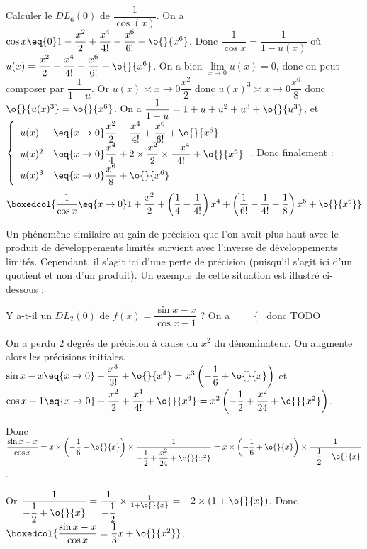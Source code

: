 \documentclass[a4paper,french,bookmarks]{article}
\begin{document}
\begin{example}{}{}
    Calculer le $DL_6(0)$ de $\dfrac{1}{\cos(x)}$.
    \tcblower
    On a $\cos x \eq{0} 1 - \dfrac{x^2}{2} + \dfrac{x^4}{4!} - \dfrac{x^6}{6!} + \o{}{x^6}$.
    Donc $\dfrac{1}{\cos x} = \dfrac{1}{1-u(x)}$ où $u(x) = \dfrac{x^2}{2} - \dfrac{x^4}{4!}+\dfrac{x^6}{6!}+\o{}{x^6}$.
    On a bien $\lim\limits_{x \to 0} u(x) = 0$, donc on peut composer par $\dfrac{1}{1-u}$. Or $u(x) \asymp{x \to 0} \dfrac{x^2}{2}$ donc $u(x)^3 \asymp{x \to 0} \dfrac{x^6}{8}$ donc $\o{}{u(x)^3} = \o{}{x^6}$.
    On a $\dfrac{1}{1-u} = 1 + u + u^2 + u^3 + \o{}{u^3}$, et $\left\lbrace\begin{array}{ll}
        u(x) &\eq{x \to 0} \dfrac{x^2}{2} - \dfrac{x^4}{4!} + \dfrac{x^6}{6!} + \o{}{x^6}\\
        u(x)^2 &\eq{x \to 0} \dfrac{x^4}{4} + 2\times\dfrac{x^2}{2}\times\dfrac{-x^4}{4!} + \o{}{x^6}\\
        u(x)^3 &\eq{x \to 0} \dfrac{x^6}{8} + \o{}{x^6}
    \end{array}\right.$. Donc finalement :
    \[\boxedcol{\dfrac{1}{\cos{x}} \eq{x \to 0} 1 + \dfrac{x^2}{2} + \left(\dfrac{1}{4}-\dfrac{1}{4!}\right)x^4 + \left(\dfrac{1}{6!}-\dfrac{1}{4!}+\dfrac{1}{8}\right)x^6 + \o{}{x^6}}\]
\end{example}

Un phénomène similaire au gain de précision que l'on avait plus haut avec le produit de développements limités survient avec l'inverse de développements limités. Cependant, il s'agit ici d'une perte de précision (puisqu'il s'agit ici d'un quotient et non d'un produit). Un exemple de cette situation est illustré ci-dessous :

\begin{example}{}{}
    Y a-t-il un $DL_2(0)$ de $f(x) = \dfrac{\sin x - x}{\cos x - 1}$ ?
    \tcblower
    On a $\left.\begin{array}{ll}
         &  \\
         & 
    \end{array}\right\lbrace$ donc TODO
    
    On a perdu $2$ degrés de précision à cause du $x^2$ du dénominateur. On augmente alors les précisions initiales.
    $\sin x - x \eq{x \to 0} -\dfrac{x^3}{3!} + \o{}{x^4}=x^3\left(-\dfrac{1}{6}+\o{}{x}\right)$ et $\cos{x} - 1 \eq{x \to 0} -\dfrac{x^2}{2}+\dfrac{x^4}{4!}+\o{}{x^4}=x^2\left(-\dfrac{1}{2}+\dfrac{x^2}{24}+\o{}{x^2}\right)$.
    
    Donc $\dfrac{\sin x - x}{\cos x} = x\times\left(-\dfrac{1}{6}+\o{}{x}\right)\times\dfrac{1}{-\dfrac{1}{2}+\dfrac{x^2}{24}+\o{}{x^2}} = x\times\left(-\dfrac{1}{6}+\o{}{x}\right)\times\dfrac{1}{-\dfrac{1}{2}+\o{}{x}}$.
    
    Or $\dfrac{1}{-\dfrac{1}{2}+\o{}{x}} = \dfrac{1}{-\dfrac{1}{2}}\times\frac{1}{1+\o{}{x}} = -2\times(1+\o{}{x})$.
    Donc $\boxedcol{\dfrac{\sin x - x}{\cos x} = \dfrac{1}{3}x + \o{}{x^2}}$.
\end{example}
\end{document}
